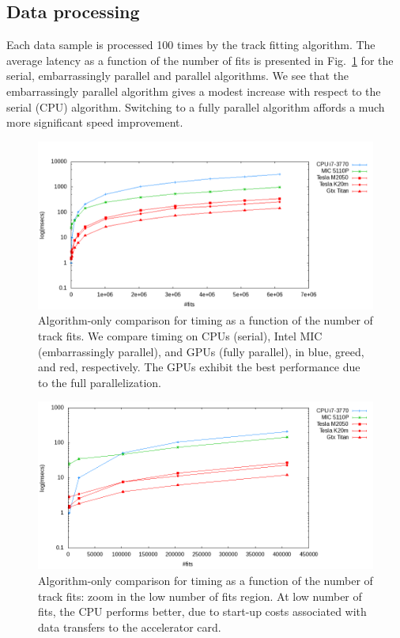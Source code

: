 \documentclass[a4]{jpconf}
\begin{document}
\subsection{Data processing}
Each data sample is processed 100 times by the track fitting algorithm. 
The average latency as a function of the number of fits is presented in 
Fig.~\ref{fig:algo_only_timing} for the serial,
embarrassingly parallel and parallel algorithms. We see that the
embarrassingly parallel algorithm gives a modest increase with respect
to the serial (CPU) algorithm. Switching to a fully parallel algorithm
affords a much more significant speed improvement. 
\begin{figure}[tbp]
  \centering
  \includegraphics[width=0.9\linewidth]{figures/TimeComp_MIC}
  \caption{Algorithm-only comparison for timing as a function of the
    number of track fits. We compare timing on CPUs (serial), Intel
    MIC (embarrassingly parallel), and GPUs (fully parallel), in
    blue, greed, and red, respectively. The GPUs exhibit the best
    performance due to the full parallelization. }
  \label{fig:algo_only_timing}
\end{figure}
\begin{figure}[tbp]
  \centering
  \includegraphics[width=0.9\linewidth]{figures/TimeCompZoom_MIC.png} 
  \caption{Algorithm-only comparison for timing as a function of the
    number of track fits: zoom in the low number of fits region. At
    low number of fits, the CPU performs better, due to start-up
    costs associated with data transfers to the accelerator card.}
  \label{fig:algo_only_timing_zoom}
\end{figure}
\end{document}
